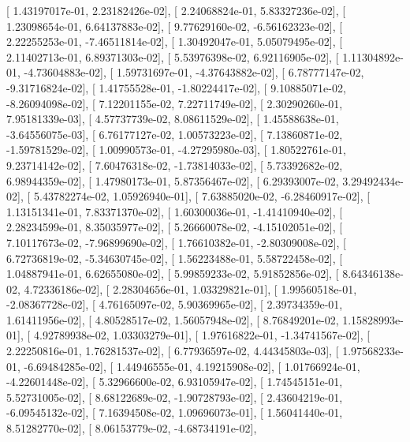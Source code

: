 \documentclass{article}
\begin{document}
       [  1.43197017e-01,   2.23182426e-02],
       [  2.24068824e-01,   5.83327236e-02],
       [  1.23098654e-01,   6.64137883e-02],
       [  9.77629160e-02,  -6.56162323e-02],
       [  2.22255253e-01,  -7.46511814e-02],
       [  1.30492047e-01,   5.05079495e-02],
       [  2.11402713e-01,   6.89371303e-02],
       [  5.53976398e-02,   6.92116905e-02],
       [  1.11304892e-01,  -4.73604883e-02],
       [  1.59731697e-01,  -4.37643882e-02],
       [  6.78777147e-02,  -9.31716824e-02],
       [  1.41755528e-01,  -1.80224417e-02],
       [  9.10885071e-02,  -8.26094098e-02],
       [  7.12201155e-02,   7.22711749e-02],
       [  2.30290260e-01,   7.95181339e-03],
       [  4.57737739e-02,   8.08611529e-02],
       [  1.45588638e-01,  -3.64556075e-03],
       [  6.76177127e-02,   1.00573223e-02],
       [  7.13860871e-02,  -1.59781529e-02],
       [  1.00990573e-01,  -4.27295980e-03],
       [  1.80522761e-01,   9.23714142e-02],
       [  7.60476318e-02,  -1.73814033e-02],
       [  5.73392682e-02,   6.98944359e-02],
       [  1.47980173e-01,   5.87356467e-02],
       [  6.29393007e-02,   3.29492434e-02],
       [  5.43782274e-02,   1.05926940e-01],
       [  7.63885020e-02,  -6.28460917e-02],
       [  1.13151341e-01,   7.83371370e-02],
       [  1.60300036e-01,  -1.41410940e-02],
       [  2.28234599e-01,   8.35035977e-02],
       [  5.26660078e-02,  -4.15102051e-02],
       [  7.10117673e-02,  -7.96899690e-02],
       [  1.76610382e-01,  -2.80309008e-02],
       [  6.72736819e-02,  -5.34630745e-02],
       [  1.56223488e-01,   5.58722458e-02],
       [  1.04887941e-01,   6.62655080e-02],
       [  5.99859233e-02,   5.91852856e-02],
       [  8.64346138e-02,   4.72336186e-02],
       [  2.28304656e-01,   1.03329821e-01],
       [  1.99560518e-01,  -2.08367728e-02],
       [  4.76165097e-02,   5.90369965e-02],
       [  2.39734359e-01,   1.61411956e-02],
       [  4.80528517e-02,   1.56057948e-02],
       [  8.76849201e-02,   1.15828993e-01],
       [  4.92789938e-02,   1.03303279e-01],
       [  1.97616822e-01,  -1.34741567e-02],
       [  2.22250816e-01,   1.76281537e-02],
       [  6.77936597e-02,   4.44345803e-03],
       [  1.97568233e-01,  -6.69484285e-02],
       [  1.44946555e-01,   4.19215908e-02],
       [  1.01766924e-01,  -4.22601448e-02],
       [  5.32966600e-02,   6.93105947e-02],
       [  1.74545151e-01,   5.52731005e-02],
       [  8.68122689e-02,  -1.90728793e-02],
       [  2.43604219e-01,  -6.09545132e-02],
       [  7.16394508e-02,   1.09696073e-01],
       [  1.56041440e-01,   8.51282770e-02],
       [  8.06153779e-02,  -4.68734191e-02],
\end{document}
